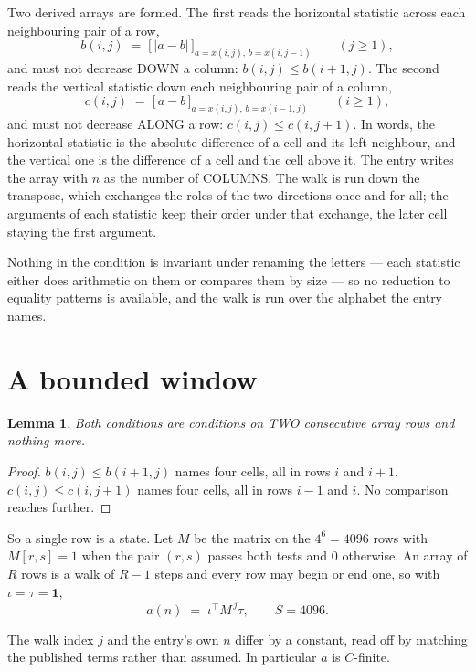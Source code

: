 \documentclass[11pt,a4paper]{article}
\theoremstyle{plain}
\newtheorem{lemma}[theorem]{Lemma}
\theoremstyle{definition}
\begin{document}
Two derived arrays are formed. The first reads the horizontal statistic across each
neighbouring pair of a row,
\[
b(i,j)\;=\;\bigl[\,\lvert a-b\rvert\,\bigr]_{a=x(i,j),\,b=x(i,j-1)}\qquad (j\ge1),
\]
and must not decrease DOWN a column: $b(i,j)\le b(i{+}1,j)$. The second reads the vertical
statistic down each neighbouring pair of a column,
\[
c(i,j)\;=\;\bigl[\,a-b\,\bigr]_{a=x(i,j),\,b=x(i{-}1,j)}\qquad (i\ge1),
\]
and must not decrease ALONG a row: $c(i,j)\le c(i,j{+}1)$. In words, the horizontal statistic
is the absolute difference of a cell and its left neighbour, and the vertical one is
the difference of a cell and the cell above it. The entry writes the array with $n$ as the number of COLUMNS. The walk is run down the transpose, which exchanges the roles of the two directions once and for all; the arguments of each statistic keep their order under that exchange, the later cell staying the first argument.

Nothing in the condition is invariant under renaming the letters --- each statistic either does
arithmetic on them or compares them by size --- so no reduction to equality patterns is
available, and the walk is run over the alphabet the entry names.

\section{A bounded window}

\begin{lemma}\label{lem:win}
Both conditions are conditions on TWO consecutive array rows and nothing more.
\end{lemma}

\begin{proof}
$b(i,j)\le b(i{+}1,j)$ names four cells, all in rows $i$ and $i+1$. $c(i,j)\le c(i,j{+}1)$
names four cells, all in rows $i-1$ and $i$. No comparison reaches further.
\end{proof}

So a single row is a state. Let $M$ be the matrix on the $4^{6}=4096$ rows with
$M[r,s]=1$ when the pair $(r,s)$ passes both tests and $0$ otherwise. An array of $R$ rows is a
walk of $R-1$ steps and every row may begin or end one, so with $\iota=\tau=\mathbf{1}$,
\[
a(n)\;=\;\iota^{\!\top}M^{\,j}\tau ,\qquad S=4096.
\]

The walk index $j$ and the entry's own $n$ differ by a constant, read off by matching the
published terms rather than assumed. In particular $a$ is $C$-finite.
\end{document}
